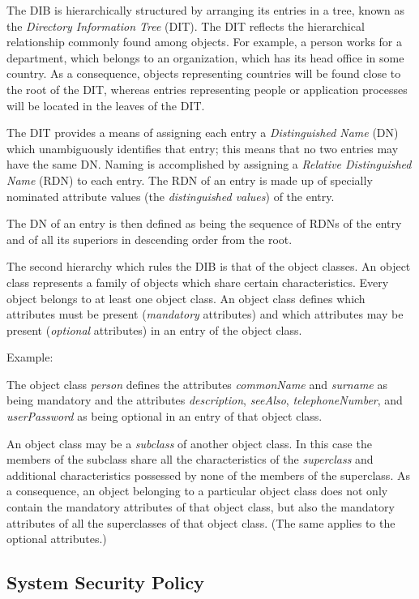The DIB is hierarchically structured by arranging its entries
in a tree, known as the {\em Directory Information Tree} (DIT).
The DIT reflects the hierarchical relationship commonly found
among objects. For example, a person works for a department,
which belongs to an organization, which has its head office
in some country. As a consequence, objects representing countries
will be found close to the root of the DIT, whereas entries representing
people or application processes will be located in the leaves of the DIT.

The DIT provides a means of assigning each entry a {\em Distinguished
Name} (DN) which unambiguously identifies that entry; this means that
no two entries may have the same DN.
Naming is accomplished by assigning a {\em Relative Distinguished Name}
(RDN) to each entry. The RDN of an entry is made up of specially
nominated attribute values (the {\em distinguished values}) of the
entry.

The DN of an entry is then defined as being the sequence of RDNs of the
entry and of all its superiors in descending order from the root.

The second hierarchy which rules the DIB is that of the object classes.
An object class represents a family of objects which share certain
characteristics. Every object belongs to at least one object class.
An object class defines which attributes must be present ({\em mandatory}
attributes) and which attributes may be present ({\em optional}
attributes) in an entry of the object class.

Example:

The object class {\em person} defines the attributes {\em commonName}
and {\em surname} as being mandatory and the attributes {\em description},
{\em seeAlso}, {\em telephoneNumber}, and {\em userPassword} as being
optional in an entry of that object class.

An object class may be a {\em subclass} of another object class. In
this case the members of the subclass share all the characteristics
of the {\em superclass} and additional characteristics possessed
by none of the members of the superclass. As a consequence, an object
belonging to a particular object class does not only contain
the mandatory attributes of that object class, but also the
mandatory attributes of all the superclasses of that object class.
(The same applies to the optional attributes.)



\subsection{System Security Policy}

